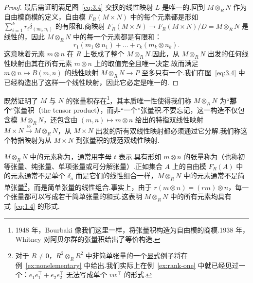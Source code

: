 \begin{proof}
最后需证明满足图~\eqref{eq:3.4} 交换的线性映射 $L$ 是唯一的.回到 $M \otimes_R N$ 作为自由模商模的定义，自由模 $F_R(M \times N)$ 中的每个元素都是形如 $\sum_{i=1}^k r_i \delta_{(m_i, n_i)}$ 的有限和.商映射 $F_R(M \times N) \to F_R(M \times N)/D = M \otimes_R N$ 是线性的，因此 $M \otimes_R N$ 中的每一个元素都是有限和：
\begin{equation}
  r_1 (m_1 \otimes n_1) + \dots + r_k (m_k \otimes n_k). \label{eq:3.5}
\end{equation}
这意味着元素 $m \otimes n$ 在 $R$ 上张成了整个 $M \otimes_R N$.因此，从 $M \otimes_R N$ 出发的任何线性映射由其在所有元素 $m \otimes n$ 上的取值完全且唯一决定.故而满足 $m \otimes n \mapsto B(m, n)$ 的线性映射 $M \otimes_R N \to P$ 至多只有一个.我们在图~\eqref{eq:3.4} 中已经构造出了这样一个线性映射，因此它必定是唯一的.
\end{proof}

既然证明了 $M$ 与 $N$ 的张量积存在\footnote{1948 年，Bourbaki \cite{bourbaki-alg} 像我们这里一样，将张量积构造为自由模的商模.1938 年，Whitney \cite{whitney} 对阿贝尔群的张量积给出了等价构造.}，其本质唯一性使得我们称 $M \otimes_R N$ 为``\textbf{那个}''张量积（the tensor product），而非``一个''张量积.不要忘记，这一构造不仅包含模 $M \otimes_R N$，还包含由 $(m, n) \mapsto m \otimes n$ 给出的特指双线性映射 $M \times N \xrightarrow{\otimes} M \otimes_R N$，从 $M \times N$ 出发的所有双线性映射都必须通过它分解.我们称这个特指映射为从 $M \times N$ 到张量积的规范双线性映射.

$M \otimes_R N$ 中的元素称为，通常用字母 $t$ 表示.具有形如 $m \otimes n$ 的张量称为（也称初等张量、纯张量、单项张量或可分解张量）.正如集合 $A$ 上的自由模 $F_R(A)$ 中的元素通常不是单个 $\delta_a$ 而是它们的线性组合一样，$M \otimes_R N$ 中的元素通常不是简单张量\footnote{对于 $R \neq 0$，$R^2 \otimes_R R^2$ 中非简单张量的一个显式例子将在例~\ref{ex:nonelementary} 中给出.我们实际上在例~\ref{ex:rank-one} 中就已经见过一个：$e_1 e_1^\top + e_2 e_2^\top$ 无法写成单个 $v w^\top$ 的形式.}，而是简单张量的线性组合.事实上，由于 $r(m \otimes n) = (rm) \otimes n$，每一个张量都可以写成若干简单张量的和式.这表明 $M \otimes_R N$ 中的所有元素均具有式~\eqref{eq:1.4} 的形式.

